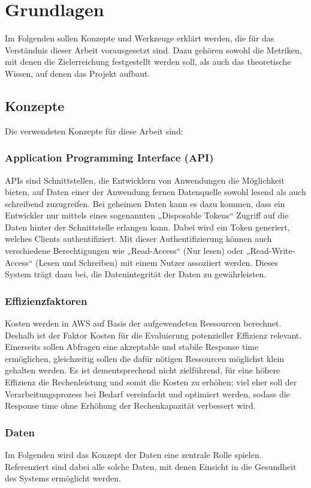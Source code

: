 \section{Grundlagen}
Im Folgenden sollen Konzepte und Werkzeuge erklärt werden, die für das Verständnis dieser Arbeit vorausgesetzt sind. Dazu gehören sowohl die Metriken, mit denen die Zielerreichung festgestellt werden soll, als auch das theoretische Wissen, auf denen das Projekt aufbaut. 
\subsection {Konzepte} 
Die verwendeten Konzepte für diese Arbeit sind: 
\subsubsection{Application Programming Interface (API)}
APIs sind Schnittstellen, die Entwicklern von Anwendungen die Möglichkeit bieten, auf Daten einer der Anwendung fernen Datenquelle sowohl lesend als auch schreibend zuzugreifen. \cite{Masse2011} Bei geheimen Daten kann es dazu kommen, dass ein Entwickler nur mittels eines sogenannten „Disposable Tokens“ Zugriff auf die Daten hinter der Schnittstelle erlangen kann. Dabei wird ein Token generiert, welches Clients authentifiziert. Mit dieser Authentifizierung können auch verschiedene Berechtigungen wie „Read-Access“ (Nur lesen) oder „Read-Write-Access“ (Lesen und Schreiben) mit einem Nutzer assoziiert werden. Dieses System trägt dazu bei, die Datenintegrität der Daten zu gewährleisten.
\subsubsection{Effizienzfaktoren} 
Kosten werden in AWS auf Basis der aufgewendeten Ressourcen berechnet. \cite{Kavis2014} Deshalb ist der Faktor Kosten für die Evaluierung potenzieller Effizienz relevant. Einerseits sollen Abfragen eine akzeptable und stabile Response time ermöglichen, gleichzeitig sollen die dafür nötigen Ressourcen möglichst klein gehalten werden. Es ist dementsprechend nicht zielführend, für eine höhere Effizienz die Rechenleistung und somit die Kosten zu erhöhen; viel eher soll der Verarbeitungsprozess bei Bedarf vereinfacht und optimiert werden, sodass die Response time ohne Erhöhung der Rechenkapazität verbessert wird. \cite{AWS2024e} 
\subsubsection{Daten}
Im Folgenden wird das Konzept der Daten eine zentrale Rolle spielen. Referenziert sind dabei alle solche Daten, mit denen Einsicht in die Gesundheit des Systems ermöglicht werden. 
